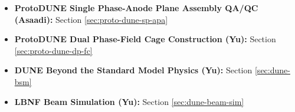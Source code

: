 \begin{itemize}

\item{\textbf{ProtoDUNE Single Phase-Anode Plane Assembly QA/QC (Asaadi):}} Section \ref{sec:proto-dune-sp-apa}

\item {{\bf ProtoDUNE Dual Phase-Field Cage Construction (Yu):}} Section \ref{sec:proto-dune-dp-fc}

\item {\textbf{DUNE Beyond the Standard Model Physics (Yu):}} Section \ref{sec:dune-bsm}

\item {\textbf{LBNF Beam Simulation (Yu):}} Section \ref{sec:dune-beam-sim}



\end{itemize}


